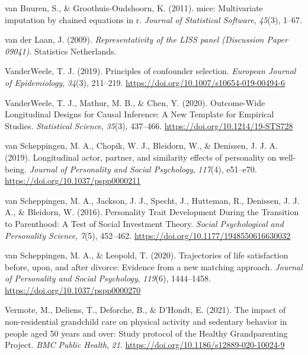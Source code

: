 \documentclass[
  english,
  man, noextraspace]{apa7}
\begin{document}
\leavevmode\hypertarget{ref-mice2011}{}%
van Buuren, S., \& Groothuis-Oudshoorn, K. (2011). mice: Multivariate imputation by chained equations in r. \emph{Journal of Statistical Software}, \emph{45}(3), 1--67.

\leavevmode\hypertarget{ref-vanderlaanRepresentativityLISSPanel2009}{}%
van der Laan, J. (2009). \emph{Representativity of the LISS panel (Discussion Paper 09041)}. Statistics Netherlands.

\leavevmode\hypertarget{ref-vanderweelePrinciplesConfounderSelection2019}{}%
VanderWeele, T. J. (2019). Principles of confounder selection. \emph{European Journal of Epidemiology}, \emph{34}(3), 211--219. \url{https://doi.org/10.1007/s10654-019-00494-6}

\leavevmode\hypertarget{ref-vanderweeleOutcomeWideLongitudinalDesigns2020}{}%
VanderWeele, T. J., Mathur, M. B., \& Chen, Y. (2020). Outcome-Wide Longitudinal Designs for Causal Inference: A New Template for Empirical Studies. \emph{Statistical Science}, \emph{35}(3), 437--466. \url{https://doi.org/10.1214/19-STS728}

\leavevmode\hypertarget{ref-vanscheppingenLongitudinalActorPartner2019}{}%
van Scheppingen, M. A., Chopik, W. J., Bleidorn, W., \& Denissen, J. J. A. (2019). Longitudinal actor, partner, and similarity effects of personality on well-being. \emph{Journal of Personality and Social Psychology}, \emph{117}(4), e51--e70. \url{https://doi.org/10.1037/pspp0000211}

\leavevmode\hypertarget{ref-vanscheppingenPersonalityTraitDevelopment2016}{}%
van Scheppingen, M. A., Jackson, J. J., Specht, J., Hutteman, R., Denissen, J. J. A., \& Bleidorn, W. (2016). Personality Trait Development During the Transition to Parenthood: A Test of Social Investment Theory. \emph{Social Psychological and Personality Science}, \emph{7}(5), 452--462. \url{https://doi.org/10.1177/1948550616630032}

\leavevmode\hypertarget{ref-vanscheppingenTrajectoriesLifeSatisfaction2020}{}%
van Scheppingen, M. A., \& Leopold, T. (2020). Trajectories of life satisfaction before, upon, and after divorce: Evidence from a new matching approach. \emph{Journal of Personality and Social Psychology}, \emph{119}(6), 1444--1458. \url{https://doi.org/10.1037/pspp0000270}

\leavevmode\hypertarget{ref-vermoteImpactNonresidentialGrandchild2021a}{}%
Vermote, M., Deliens, T., Deforche, B., \& D'Hondt, E. (2021). The impact of non-residential grandchild care on physical activity and sedentary behavior in people aged 50 years and over: Study protocol of the Healthy Grandparenting Project. \emph{BMC Public Health}, \emph{21}. \url{https://doi.org/10.1186/s12889-020-10024-9}
\end{document}
